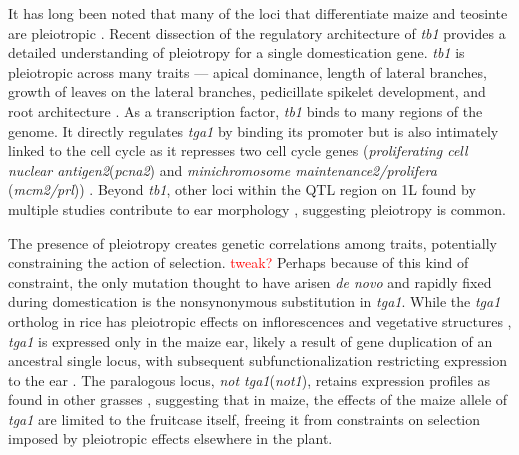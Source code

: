 \documentclass[9pt,twocolumn,twoside]{rilabRxiv}
\newcommand{\jri}[1]{{\small \textcolor{red}{#1}}}
\begin{document}
﻿It has long been noted that many of the loci that differentiate maize and teosinte are pleiotropic \citep{collins1920, beadle1939, mangelsdorf1939, langham1940}.
Recent dissection of the regulatory architecture of \textit{tb1} provides a detailed understanding of pleiotropy for a single domestication gene.
﻿\textit{tb1} is pleiotropic across many traits --- apical dominance, length of lateral branches, growth of leaves on the lateral branches, pedicillate spikelet development, and root architecture \citep{hubbard2002, gaudin2014}.
As a transcription factor, \textit{tb1} binds to many regions of the genome.
It directly regulates \textit{tga1} by binding its promoter but is also intimately linked to the cell cycle as it represses two cell cycle genes (\textit{proliferating cell nuclear antigen2}(\textit{pcna2}) and \textit{minichromosome maintenance2/prolifera} (\textit{mcm2/prl})) \citep{studer2017}.
﻿Beyond \textit{tb1}, other loci within the QTL region on 1L found by multiple studies \citep{doebley1991, doebley1993, briggs2007} contribute to ear morphology \citep{studer2011fract, yang2016}, suggesting pleiotropy is common.

﻿The presence of pleiotropy creates genetic correlations among traits, potentially constraining the action of selection. \jri{tweak?}
Perhaps because of this kind of constraint, the only mutation thought to have arisen \textit{de novo} and rapidly fixed during domestication is the nonsynonymous substitution in \textit{tga1}.
﻿While the \textit{tga1} ortholog in rice has pleiotropic effects on inflorescences and vegetative structures \citep{preston2012, wang2015}, \textit{tga1} is expressed only in the maize ear, likely a result of gene duplication of an ancestral single locus, with subsequent subfunctionalization  restricting expression to the ear \citep{preston2012, wang2015}.
The paralogous locus, \textit{not tga1}(\textit{not1}), retains expression profiles as found in other grasses \citep{wang2011, wang2012}, suggesting that in maize, the effects of the maize allele of \textit{tga1} are limited to the fruitcase itself, freeing it from constraints on selection imposed by pleiotropic effects elsewhere in the plant.
\end{document}
